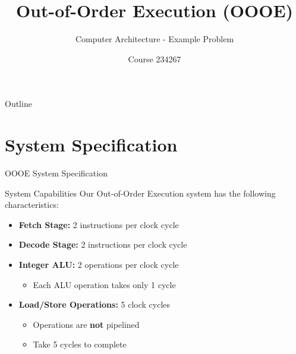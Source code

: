 \documentclass[aspectratio=169,12pt]{beamer}
\title{Out-of-Order Execution (OOOE)}
\subtitle{Computer Architecture - Example Problem}
\author{Course 234267}
\date{}
\begin{document}
\begin{frame}
\titlepage
\end{frame}

\begin{frame}{Outline}
\tableofcontents
\end{frame}

\section{System Specification}

\begin{frame}{OOOE System Specification}
\begin{block}{System Capabilities}
Our Out-of-Order Execution system has the following characteristics:
\end{block}

\begin{itemize}
    \item \textbf{Fetch Stage:} 2 instructions per clock cycle
    \item \textbf{Decode Stage:} 2 instructions per clock cycle  
    \item \textbf{Integer ALU:} 2 operations per clock cycle
    \begin{itemize}
        \item Each ALU operation takes only 1 cycle
    \end{itemize}
    \item \textbf{Load/Store Operations:} 5 clock cycles
    \begin{itemize}
        \item Operations are \textbf{not} pipelined
        \item Take 5 cycles to complete
    \end{itemize}
\end{itemize}
\end{frame}
\end{document}
